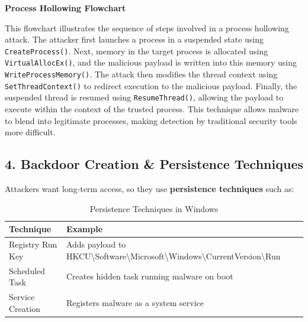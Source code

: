 \begin{center}
    \textbf{Process Hollowing Flowchart} \\
\end{center}  

This flowchart illustrates the sequence of steps involved in a process hollowing attack. 
The attacker first launches a process in a suspended state using \texttt{CreateProcess()}. 
Next, memory in the target process is allocated using \texttt{VirtualAllocEx()}, and the malicious payload is written into this memory using \texttt{WriteProcessMemory()}. 
The attack then modifies the thread context using \texttt{SetThreadContext()} to redirect execution to the malicious payload. 
Finally, the suspended thread is resumed using \texttt{ResumeThread()}, allowing the payload to execute within the context of the trusted process.
This technique allows malware to blend into legitimate processes, making detection by traditional security tools more difficult.


\subsection{4. Backdoor Creation \& Persistence Techniques}

Attackers want long-term access, so they use \textbf{persistence techniques} such as:

\begin{table}[H]
    \centering
    \begin{tabular}{|l|l|}
        \hline
        \textbf{Technique} & \textbf{Example} \\
        \hline
        Registry Run Key & Adds payload to HKCU\textbackslash Software\textbackslash Microsoft\textbackslash Windows\textbackslash CurrentVersion\textbackslash Run \\
        Scheduled Task & Creates hidden task running malware on boot \\
        Service Creation & Registers malware as a system service \\
        \hline
    \end{tabular}
    \caption{Persistence Techniques in Windows}
\end{table}



